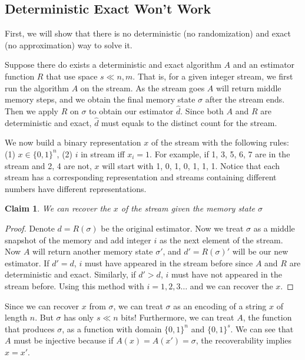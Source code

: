 \documentclass[11pt]{article}
\newtheorem{claim}[theorem]{Claim}
\begin{document}
\subsection{Deterministic Exact Won't Work}

First, we will show that there is no deterministic (no randomization) and exact (no approximation) way to solve it.

Suppose there do exists a deterministic and exact algorithm $A$ and an estimator function $R$ that use space $s \ll n, m$. That is, for a given integer stream, we first run the algorithm $A$ on the stream. As the stream goes $A$ will return middle memory steps, and we obtain the final memory state $\sigma$ after the stream ends. Then we apply $R$ on $\sigma$ to obtain our estimator $\hat{d}$. Since both $A$ and $R$ are deterministic and exact, $\hat{d}$ must equals to the distinct count for the stream.

We now build a binary representation $x$ of the stream with the following rules: (1) $x \in \{0, 1\}^{n}$, (2) $i$ in stream iff $x_i = 1$. For example, if 1, 3, 5, 6, 7 are in the stream and 2, 4 are not, $x$ will start with 1, 0, 1, 0, 1, 1, 1. Notice that each stream has a corresponding representation and streams containing different numbers have different representations.

\begin{claim}
We can recover the $x$ of the stream given the memory state $\sigma$
\end{claim}

\begin{proof}
Denote $d=R(\sigma)$ be the original estimator. Now we treat $\sigma$ as a middle snapshot of the memory and add integer $i$ as the next element of the stream. Now $A$ will return another memory state $\sigma'$, and $d'=R(\sigma)'$ will be our new estimator. If $d'=d$, $i$ must have appeared in the stream before since $A$ and $R$ are deterministic and exact. Similarly, if $d'>d$, $i$ must have not appeared in the stream before. Using this method with $i=1, 2, 3\ldots$ and we can recover the $x$.
\end{proof}

Since we can recover $x$ from $\sigma$, we can treat $\sigma$ as an encoding of a string $x$ of length $n$. But $\sigma$ has only $s \ll n$ bits! Furthermore, we can treat $A$, the function that produces $\sigma$, as a function with domain $\{0, 1\}^{n}$ and $\{0, 1\}^{s}$. We can see that $A$ must be injective because if $A(x)=A(x')=\sigma$, the recoverability implies $x=x'$.
\end{document}
